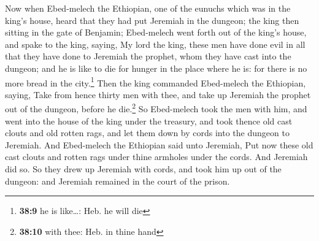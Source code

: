  Now when Ebed-melech the Ethiopian, one of the eunuchs
which was in the king's house, heard that they had put Jeremiah in the
dungeon; the king then sitting in the gate of Benjamin; 
Ebed-melech went forth out of the king's house, and spake to the king,
saying,  My lord the king, these men have done evil in all
that they have done to Jeremiah the prophet, whom they have cast into
the dungeon; and he is like to die for hunger in the place where he is:
for there is no more bread in the city.\footnote{\textbf{38:9} he is
  like\ldots: Heb. he will die}  Then the king commanded
Ebed-melech the Ethiopian, saying, Take from hence thirty men with thee,
and take up Jeremiah the prophet out of the dungeon, before he
die.\footnote{\textbf{38:10} with thee: Heb. in thine hand}
 So Ebed-melech took the men with him, and went into the
house of the king under the treasury, and took thence old cast clouts
and old rotten rags, and let them down by cords into the dungeon to
Jeremiah.  And Ebed-melech the Ethiopian said unto
Jeremiah, Put now these old cast clouts and rotten rags under thine
armholes under the cords. And Jeremiah did so.  So they
drew up Jeremiah with cords, and took him up out of the dungeon: and
Jeremiah remained in the court of the prison.

